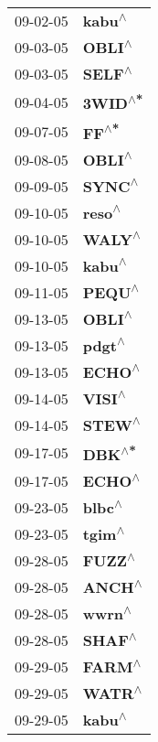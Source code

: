 \begin{supertabular}{p{0.08\textwidth}p{0.2\textwidth}}
 09-02-05 &    \textbf{kabu\textsuperscript{$\wedge$}} \\
 09-03-05 &    \textbf{OBLI\textsuperscript{$\wedge$}} \\
 09-03-05 &    \textbf{SELF\textsuperscript{$\wedge$}} \\
 09-04-05 &   \textbf{3WID\textsuperscript{$\wedge$*}} \\
 09-07-05 &     \textbf{FF\textsuperscript{$\wedge$*}} \\
 09-08-05 &    \textbf{OBLI\textsuperscript{$\wedge$}} \\
 09-09-05 &    \textbf{SYNC\textsuperscript{$\wedge$}} \\
 09-10-05 &    \textbf{reso\textsuperscript{$\wedge$}} \\
 09-10-05 &    \textbf{WALY\textsuperscript{$\wedge$}} \\
 09-10-05 &    \textbf{kabu\textsuperscript{$\wedge$}} \\
 09-11-05 &    \textbf{PEQU\textsuperscript{$\wedge$}} \\
 09-13-05 &    \textbf{OBLI\textsuperscript{$\wedge$}} \\
 09-13-05 &    \textbf{pdgt\textsuperscript{$\wedge$}} \\
 09-13-05 &    \textbf{ECHO\textsuperscript{$\wedge$}} \\
 09-14-05 &    \textbf{VISI\textsuperscript{$\wedge$}} \\
 09-14-05 &    \textbf{STEW\textsuperscript{$\wedge$}} \\
 09-17-05 &    \textbf{DBK\textsuperscript{$\wedge$*}} \\
 09-17-05 &    \textbf{ECHO\textsuperscript{$\wedge$}} \\
 09-23-05 &    \textbf{blbc\textsuperscript{$\wedge$}} \\
 09-23-05 &    \textbf{tgim\textsuperscript{$\wedge$}} \\
 09-28-05 &    \textbf{FUZZ\textsuperscript{$\wedge$}} \\
 09-28-05 &    \textbf{ANCH\textsuperscript{$\wedge$}} \\
 09-28-05 &    \textbf{wwrn\textsuperscript{$\wedge$}} \\
 09-28-05 &    \textbf{SHAF\textsuperscript{$\wedge$}} \\
 09-29-05 &    \textbf{FARM\textsuperscript{$\wedge$}} \\
 09-29-05 &    \textbf{WATR\textsuperscript{$\wedge$}} \\
 09-29-05 &    \textbf{kabu\textsuperscript{$\wedge$}} \\

\end{supertabular}
